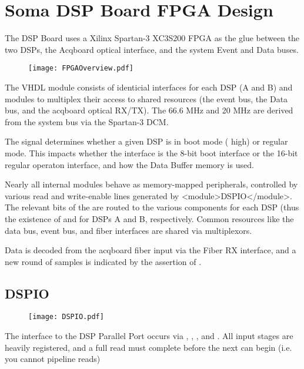 

\section{Soma DSP Board FPGA Design}


The DSP Board uses a Xilinx Spartan-3 XC3S200 FPGA as the glue between
the two DSPs, the Acqboard optical interface, and the system Event and
Data buses.
  
\begin{figure}
\texttt{[image: FPGAOverview.pdf]}
\end{figure}
  
The VHDL module consists of identicial interfaces for each DSP (A and
B) and modules to multiplex their access to shared resources (the
event bus, the Data bus, and the acqboard optical RX/TX). The 66.6 MHz
 and 20 MHz  are derived from the system
bus  via the Spartan-3 DCM.
    
  
The  signal determines whether a given DSP is in boot
mode ( high) or regular mode. This impacts whether the
interface is the 8-bit boot interface or the 16-bit regular operaton
interface, and how the Data Buffer memory is used.
  
Nearly all internal modules behave as memory-mapped peripherals,
controlled by various read and write-enable lines generated by
<module>DSPIO</module>. The relevant bits of the 
are routed to the various components for each DSP (thus the existence
of  and  for DSPs A and B,
respectively. Common resources like the data bus, event bus, and fiber
interfaces are shared via multiplexors.
  
Data is decoded from the acqboard fiber input via the Fiber RX
interface, and a new round of samples is indicated by the assertion of
.

\subsection{DSPIO}

\begin{figure}
\texttt{[image: DSPIO.pdf]}
\end{figure}

The interface to the DSP Parallel Port occurs via ,
, , and . All input stages are
heavily registered, and a full read must complete before the next can
begin (i.e. you cannot pipeline reads)

